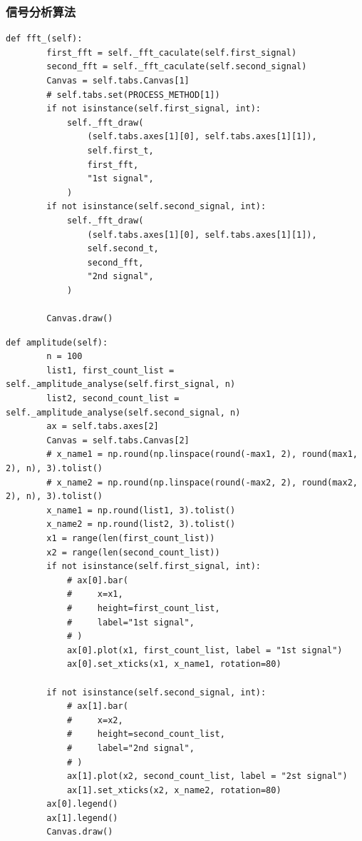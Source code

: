 \documentclass[12pt]{ctexart}
\begin{document}
\subsubsection{信号分析算法}
\begin{lstlisting}[title=傅里叶变换]
      def fft_(self):
        first_fft = self._fft_caculate(self.first_signal)
        second_fft = self._fft_caculate(self.second_signal)
        Canvas = self.tabs.Canvas[1]
        # self.tabs.set(PROCESS_METHOD[1])
        if not isinstance(self.first_signal, int):
            self._fft_draw(
                (self.tabs.axes[1][0], self.tabs.axes[1][1]),
                self.first_t,
                first_fft,
                "1st signal",
            )
        if not isinstance(self.second_signal, int):
            self._fft_draw(
                (self.tabs.axes[1][0], self.tabs.axes[1][1]),
                self.second_t,
                second_fft,
                "2nd signal",
            )

        Canvas.draw()
\end{lstlisting}
\begin{lstlisting}[title=幅值域分析]
      def amplitude(self):
        n = 100
        list1, first_count_list = self._amplitude_analyse(self.first_signal, n)
        list2, second_count_list = self._amplitude_analyse(self.second_signal, n)
        ax = self.tabs.axes[2]
        Canvas = self.tabs.Canvas[2]
        # x_name1 = np.round(np.linspace(round(-max1, 2), round(max1, 2), n), 3).tolist()
        # x_name2 = np.round(np.linspace(round(-max2, 2), round(max2, 2), n), 3).tolist()
        x_name1 = np.round(list1, 3).tolist()
        x_name2 = np.round(list2, 3).tolist()
        x1 = range(len(first_count_list))
        x2 = range(len(second_count_list))
        if not isinstance(self.first_signal, int):
            # ax[0].bar(
            #     x=x1,
            #     height=first_count_list,
            #     label="1st signal",
            # )
            ax[0].plot(x1, first_count_list, label = "1st signal")
            ax[0].set_xticks(x1, x_name1, rotation=80)

        if not isinstance(self.second_signal, int):
            # ax[1].bar(
            #     x=x2,
            #     height=second_count_list,
            #     label="2nd signal",
            # )
            ax[1].plot(x2, second_count_list, label = "2st signal")
            ax[1].set_xticks(x2, x_name2, rotation=80)
        ax[0].legend()
        ax[1].legend()
        Canvas.draw()
\end{lstlisting}
\end{document}
